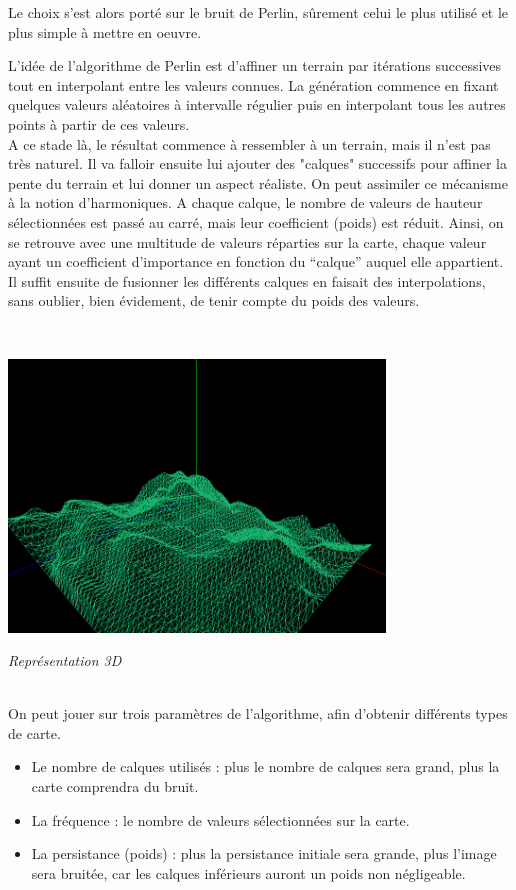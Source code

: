 \documentclass[usenames,dvipsnames]{report}
\begin{document}
    Le choix s’est alors porté sur le bruit de Perlin, sûrement celui le plus utilisé et le plus simple à mettre en oeuvre.
    

    L'idée de l'algorithme de Perlin est d'affiner un terrain par itérations successives tout en interpolant entre les valeurs connues.
    La génération commence en fixant quelques valeurs aléatoires à intervalle régulier puis en interpolant tous les autres points à partir de ces valeurs.
\\

     A ce stade là, le résultat commence à ressembler à un terrain, mais il n'est pas très naturel. Il va falloir ensuite lui ajouter des "calques" successifs pour affiner la pente 
     du terrain et lui donner un aspect réaliste.
    On peut assimiler ce mécanisme à la notion d’harmoniques. A chaque calque, le nombre de valeurs de hauteur sélectionnées est passé au carré, 
    mais leur coefficient (poids) est réduit. Ainsi, on se retrouve avec une multitude de valeurs réparties sur la carte, chaque valeur ayant un coefficient
     d’importance en fonction du “calque” auquel elle appartient. Il suffit ensuite de fusionner les différents calques en faisait des interpolations, sans oublier,
      bien évidement, de tenir compte du poids des valeurs.

\\

\bigskip

    \includegraphics[width=10cm]{gene-map4.png}


    \textit{Représentation 3D } 
\\

\bigskip

\\


    On  peut jouer sur trois paramètres de l’algorithme, afin d’obtenir différents types de carte.
    \begin{itemize}
        \item Le nombre de calques utilisés : plus le nombre de calques sera grand, plus la carte comprendra du bruit.
        \item La fréquence : le nombre de valeurs sélectionnées sur la carte.
        \item La persistance (poids) : plus la persistance initiale sera grande, plus l’image sera bruitée, car les calques inférieurs auront un poids non négligeable.
    \end{itemize}
\end{document}
